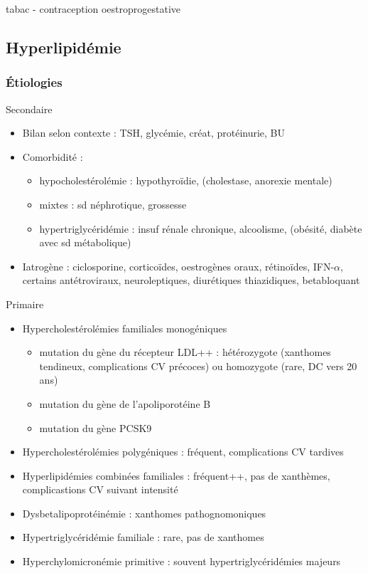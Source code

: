 \documentclass[11pt]{article}
\begin{document}
\danger tabac - contraception oestroprogestative

\subsection{Hyperlipidémie}
\label{sec:org7d1fcb0}

\subsubsection{Étiologies}
\label{sec:orgdb5c700}
Secondaire
\begin{itemize}
\item Bilan selon contexte : TSH, glycémie, créat, protéinurie, BU
\item Comorbidité : 
\begin{itemize}
\item hypocholestérolémie : hypothyroïdie, (cholestase, anorexie mentale)
\item mixtes : sd néphrotique, grossesse
\item hypertriglycéridémie : insuf rénale chronique, alcoolisme, (obésité, diabète
avec sd métabolique)
\end{itemize}
\item Iatrogène : ciclosporine, corticoïdes, oestrogènes oraux, rétinoïdes,
IFN-\(\alpha\), certains antétroviraux, neuroleptiques, diurétiques thiazidiques, betabloquant
\end{itemize}
Primaire
\begin{itemize}
\item Hypercholestérolémies familiales monogéniques
\begin{itemize}
\item mutation du gène du récepteur LDL++ : hétérozygote (xanthomes tendineux,
complications CV précoces) ou homozygote (rare, DC vers 20 ans)
\item mutation du gène de l'apoliporotéine B
\item mutation du gène PCSK9
\end{itemize}
\item Hypercholestérolémies polygéniques : fréquent, complications CV tardives
\item Hyperlipidémies combinées familiales : fréquent++, pas de xanthèmes,
complicastions CV suivant intensité
\item Dysbetalipoprotéinémie : xanthomes pathognomoniques
\item Hypertriglycéridémie familiale : rare, pas de xanthomes
\item Hyperchylomicronémie primitive : souvent hypertriglycéridémies majeurs
\end{itemize}
\end{document}
